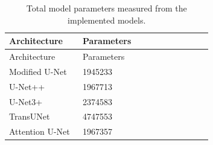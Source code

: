 \small
\begin{longtable}{p{0.34\linewidth}p{0.60\linewidth}}
\caption{Total model parameters measured from the implemented models.}\\
\toprule
Architecture & Parameters\\\midrule
\endfirsthead
\toprule
Architecture & Parameters\\\midrule
\endhead
Modified U-Net & 1945233\\
U-Net++ & 1967713\\
U-Net3+ & 2374583\\
TransUNet & 4747553\\
Attention U-Net & 1967357\\
\bottomrule\end{longtable}\normalsize
